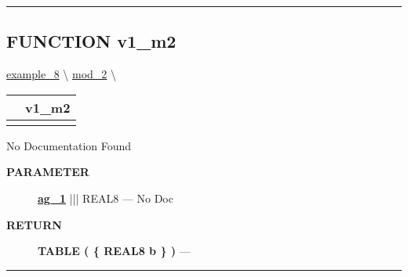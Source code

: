 \rule{\linewidth}{0.5pt}
\subsection*{\textsf{\colorbox{headtoc}{\color{white} FUNCTION}
v1\_m2}}

\hypertarget{ecldoc:intest.in1intest.example_8.mod_2.v1_m2}{}
\hspace{0pt} \hyperlink{ecldoc:intest.in1intest.example_8}{example_8} \textbackslash 
\hspace{0pt} \hyperlink{ecldoc:intest.in1intest.example_8.mod_2}{mod_2} \textbackslash 

{\renewcommand{\arraystretch}{1.5}
\begin{tabularx}{\textwidth}{|>{\raggedright\arraybackslash}l|X|}
\hline
\hspace{0pt}\mytexttt{\color{red} } & \textbf{v1\_m2} \\
\hline
\multicolumn{2}{|>{\raggedright\arraybackslash}X|}{\hspace{0pt}\mytexttt{\color{param} (REAL8 ag\_1)}} \\
\hline
\end{tabularx}
}

\par





No Documentation Found






\par
\begin{description}
\item [\colorbox{tagtype}{\color{white} \textbf{\textsf{PARAMETER}}}] \textbf{\underline{ag\_1}} ||| REAL8 --- No Doc
\end{description}







\par
\begin{description}
\item [\colorbox{tagtype}{\color{white} \textbf{\textsf{RETURN}}}] \textbf{TABLE ( \{ REAL8 b \} )} --- 
\end{description}




\rule{\linewidth}{0.5pt}




